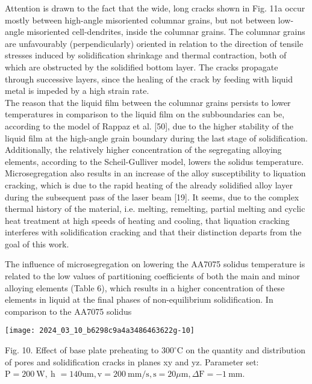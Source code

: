 \documentclass[10pt]{article}
\begin{document}
Attention is drawn to the fact that the wide, long cracks shown in Fig. 11a occur mostly between high-angle misoriented columnar grains, but not between low-angle misoriented cell-dendrites, inside the columnar grains. The columnar grains are unfavourably (perpendicularly) oriented in relation to the direction of tensile stresses induced by solidification shrinkage and thermal contraction, both of which are obstructed by the solidified bottom layer. The cracks propagate through successive layers, since the healing of the crack by feeding with liquid metal is impeded by a high strain rate.\\
The reason that the liquid film between the columnar grains persists to lower temperatures in comparison to the liquid film on the subboundaries can be, according to the model of Rappaz et al. [50], due to the higher stability of the liquid film at the high-angle grain boundary during the last stage of solidification. Additionally, the relatively higher concentration of the segregating alloying elements, according to the Scheil-Gulliver model, lowers the solidus temperature. Microsegregation also results in an increase of the alloy susceptibility to liquation cracking, which is due to the rapid heating of the already solidified alloy layer during the subsequent pass of the laser beam [19]. It seems, due to the complex thermal history of the material, i.e. melting, remelting, partial melting and cyclic heat treatment at high speeds of heating and cooling, that liquation cracking interferes with solidification cracking and that their distinction departs from the goal of this work.

The influence of microsegregation on lowering the AA7075 solidus temperature is related to the low values of partitioning coefficients of both the main and minor alloying elements (Table 6), which results in a higher concentration of these elements in liquid at the final phases of non-equilibrium solidification. In comparison to the AA7075 solidus

\begin{center}
\texttt{[image: 2024\_03\_10\_b6298c9a4a3486463622g-10]}
\end{center}

Fig. 10. Effect of base plate preheating to $300^{\circ} \mathrm{C}$ on the quantity and distribution of pores and solidification cracks in planes xy and yz. Parameter set: $\mathrm{P}=200 \mathrm{~W}, \mathrm{~h}$ $=140 \mathrm{um}, \mathrm{v}=200 \mathrm{~mm} / \mathrm{s}, \mathrm{s}=20 \mu \mathrm{m}, \Delta \mathrm{F}=-1 \mathrm{~mm}$.
\end{document}
